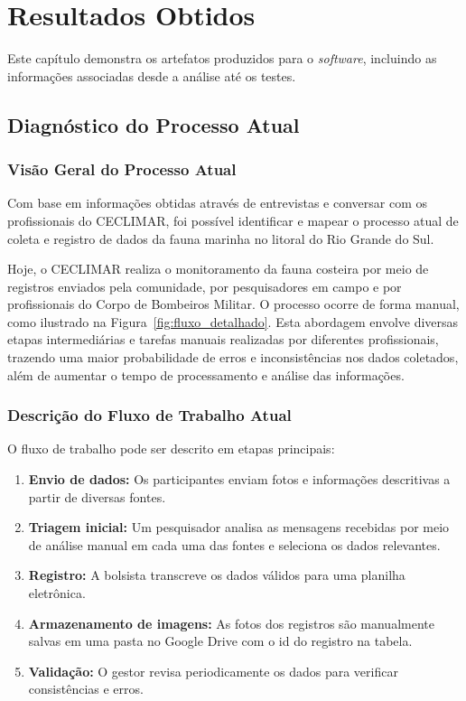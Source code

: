 \chapter{Resultados Obtidos}
Este capítulo demonstra os artefatos produzidos para o \textit{software}, incluindo 
as informações associadas desde a análise até os testes.

\section{Diagnóstico do Processo Atual} \label{chapter:diagnostico}
\subsection{Visão Geral do Processo Atual}

Com base em informações obtidas através de entrevistas e conversar com os profissionais do CECLIMAR, foi possível 
identificar e mapear o processo atual de coleta e registro de dados da fauna marinha no litoral do Rio Grande do Sul.

Hoje, o CECLIMAR realiza o monitoramento da fauna costeira por meio de registros enviados pela comunidade, 
por pesquisadores em campo e por profissionais do Corpo de Bombeiros Militar. O processo 
ocorre de forma manual, como ilustrado na Figura~\ref{fig:fluxo_detalhado}. Esta abordagem envolve 
diversas etapas intermediárias e tarefas manuais realizadas por diferentes profissionais, trazendo
uma maior probabilidade de erros e inconsistências nos dados coletados, além de aumentar o tempo
de processamento e análise das informações.

\subsection{Descrição do Fluxo de Trabalho Atual}

O fluxo de trabalho pode ser descrito em etapas principais:

\begin{enumerate}
    \item \textbf{Envio de dados:} Os participantes enviam fotos e informações descritivas a partir de diversas fontes.
    \item \textbf{Triagem inicial:} Um pesquisador analisa as mensagens recebidas por meio de análise manual em cada uma das fontes e seleciona os dados relevantes.
    \item \textbf{Registro:} A bolsista transcreve os dados válidos para uma planilha eletrônica.
    \item \textbf{Armazenamento de imagens:} As fotos dos registros são manualmente salvas em uma pasta no Google Drive com o id do registro na tabela.
    \item \textbf{Validação:} O gestor revisa periodicamente os dados para verificar consistências e erros.
\end{enumerate}

